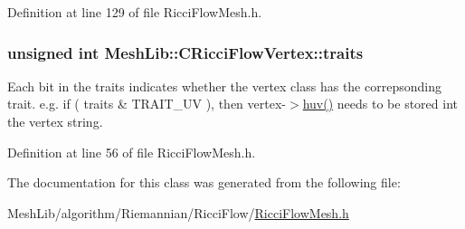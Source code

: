 Definition at line 129 of file Ricci\+Flow\+Mesh.\+h.

\subsubsection[{\texorpdfstring{traits}{traits}}]{\setlength{\rightskip}{0pt plus 5cm}unsigned int Mesh\+Lib\+::\+C\+Ricci\+Flow\+Vertex\+::traits\hspace{0.3cm}{\ttfamily [static]}}\hypertarget{class_mesh_lib_1_1_c_ricci_flow_vertex_a3af1d7b46bd87f486a1e6dbea027c91d}{}\label{class_mesh_lib_1_1_c_ricci_flow_vertex_a3af1d7b46bd87f486a1e6dbea027c91d}
Each bit in the traits indicates whether the vertex class has the correpsonding trait. e.\+g. if ( traits \& T\+R\+A\+I\+T\+\_\+\+UV ), then vertex-\/$>$\hyperlink{class_mesh_lib_1_1_c_ricci_flow_vertex_aab160a0b027baa770beabe94a40158a1}{huv()} needs to be stored int the vertex string. 

Definition at line 56 of file Ricci\+Flow\+Mesh.\+h.



The documentation for this class was generated from the following file\+:\begin{DoxyCompactItemize}
\item 
Mesh\+Lib/algorithm/\+Riemannian/\+Ricci\+Flow/\hyperlink{_ricci_flow_mesh_8h}{Ricci\+Flow\+Mesh.\+h}\end{DoxyCompactItemize}
